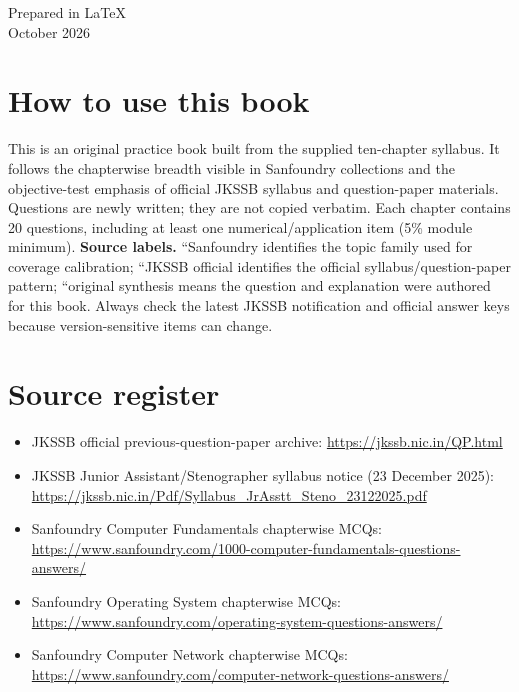 \documentclass[11pt,a4paper]{book}
\begin{document}
\frontmatter
\begin{titlepage}\centering\vspace*{2cm}{\Huge\bfseries JKSSB Computer Awareness\\[0.3em]MCQ Question Bank\par}\vspace{1cm}{\Large Complete syllabus coverage\par}\vspace{1cm}{\large 200 original MCQs with sources, answers and explanations\par}\vfill{\large Prepared in LaTeX\\October 2026\par}\end{titlepage}
\chapter*{How to use this book}
This is an original practice book built from the supplied ten-chapter syllabus. It follows the chapterwise breadth visible in Sanfoundry collections and the objective-test emphasis of official JKSSB syllabus and question-paper materials. Questions are newly written; they are not copied verbatim. Each chapter contains 20 questions, including at least one numerical/application item (5\% module minimum).
\textbf{Source labels.} ``Sanfoundry identifies the topic family used for coverage calibration; ``JKSSB official identifies the official syllabus/question-paper pattern; ``original synthesis means the question and explanation were authored for this book. Always check the latest JKSSB notification and official answer keys because version-sensitive items can change.
\chapter*{Source register}
\begin{itemize}
\item JKSSB official previous-question-paper archive: \url{https://jkssb.nic.in/QP.html}
\item JKSSB Junior Assistant/Stenographer syllabus notice (23 December 2025): \url{https://jkssb.nic.in/Pdf/Syllabus_JrAsstt_Steno_23122025.pdf}
\item Sanfoundry Computer Fundamentals chapterwise MCQs: \url{https://www.sanfoundry.com/1000-computer-fundamentals-questions-answers/}
\item Sanfoundry Operating System chapterwise MCQs: \url{https://www.sanfoundry.com/operating-system-questions-answers/}
\item Sanfoundry Computer Network chapterwise MCQs: \url{https://www.sanfoundry.com/computer-network-questions-answers/}
\end{itemize}
\tableofcontents
\mainmatter
\end{document}
